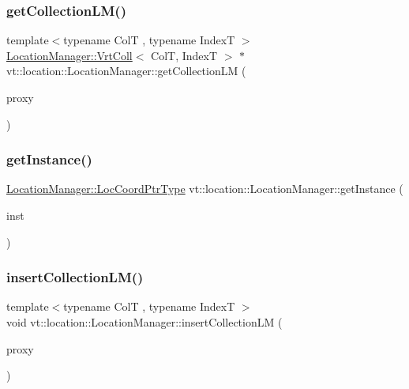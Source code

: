 \subsubsection{\texorpdfstring{get\+Collection\+L\+M()}{getCollectionLM()}}
{\footnotesize\ttfamily template$<$typename ColT , typename IndexT $>$ \\
\hyperlink{structvt_1_1location_1_1_location_manager_a189fc3b436520c19aada9623a6b4a42e}{Location\+Manager\+::\+Vrt\+Coll}$<$ ColT, IndexT $>$ $\ast$ vt\+::location\+::\+Location\+Manager\+::get\+Collection\+LM (\begin{DoxyParamCaption}\item[{\hyperlink{namespacevt_a1b417dd5d684f045bb58a0ede70045ac}{Virtual\+Proxy\+Type} const \&}]{proxy }\end{DoxyParamCaption})}

\mbox{\label{structvt_1_1location_1_1_location_manager_a1533939b198e3d7a2d5298995b87ab21}} 
\subsubsection{\texorpdfstring{get\+Instance()}{getInstance()}}
{\footnotesize\ttfamily \hyperlink{structvt_1_1location_1_1_location_manager_a98ed824c058080e538546fc731cb8f4c}{Location\+Manager\+::\+Loc\+Coord\+Ptr\+Type} vt\+::location\+::\+Location\+Manager\+::get\+Instance (\begin{DoxyParamCaption}\item[{\hyperlink{namespacevt_1_1location_a4db6456e8024af2d23fc5ae560fef866}{Loc\+Inst\+Type} const}]{inst }\end{DoxyParamCaption})\hspace{0.3cm}{\ttfamily [static]}}

\mbox{\label{structvt_1_1location_1_1_location_manager_ae62f2826ad6bebc5dcad0d6ad13af365}} 
\subsubsection{\texorpdfstring{insert\+Collection\+L\+M()}{insertCollectionLM()}}
{\footnotesize\ttfamily template$<$typename ColT , typename IndexT $>$ \\
void vt\+::location\+::\+Location\+Manager\+::insert\+Collection\+LM (\begin{DoxyParamCaption}\item[{\hyperlink{namespacevt_a1b417dd5d684f045bb58a0ede70045ac}{Virtual\+Proxy\+Type} const \&}]{proxy }\end{DoxyParamCaption})}

